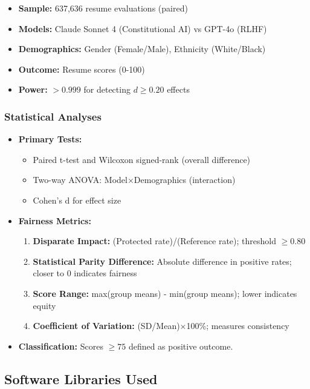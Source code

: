 \documentclass{article}
\begin{document}
\begin{itemize}
    \item \textbf{Sample:} 637,636 resume evaluations (paired)
    \item \textbf{Models:} Claude Sonnet 4 (Constitutional AI) vs GPT-4o (RLHF)
    \item \textbf{Demographics:} Gender (Female/Male), Ethnicity (White/Black)
    \item \textbf{Outcome:} Resume scores (0-100)
    \item \textbf{Power:} $> 0.999$ for detecting $d \geq 0.20$ effects
\end{itemize}

\subsubsection{Statistical Analyses}
\begin{itemize}
\item \textbf{Primary Tests:}
\begin{itemize}
    \item Paired t-test and Wilcoxon signed-rank (overall difference)
    \item Two-way ANOVA: Model×Demographics (interaction)
    \item Cohen's d for effect size
\end{itemize}

\item \textbf{Fairness Metrics:}
\begin{enumerate}
    \item \textbf{Disparate Impact:} (Protected rate)/(Reference rate); threshold $\geq 0.80$
    \item \textbf{Statistical Parity Difference:} Absolute difference in positive rates; closer to 0 indicates fairness
    \item \textbf{Score Range:} max(group means) - min(group means); lower indicates equity
    \item \textbf{Coefficient of Variation:} (SD/Mean)×100\%; measures consistency
\end{enumerate}

\item \textbf{Classification:} Scores $\geq 75$ defined as positive outcome.
\end{itemize}


\subsection{Software Libraries Used}
\end{document}
